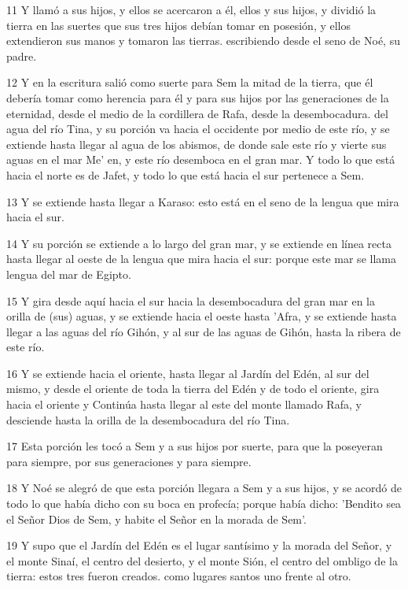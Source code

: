 \par 11 Y llamó a sus hijos, y ellos se acercaron a él, ellos y sus hijos, y dividió la tierra en las suertes que sus tres hijos debían tomar en posesión, y ellos extendieron sus manos y tomaron las tierras. escribiendo desde el seno de Noé, su padre.
\par 12 Y en la escritura salió como suerte para Sem la mitad de la tierra, que él debería tomar como herencia para él y para sus hijos por las generaciones de la eternidad, desde el medio de la cordillera de Rafa, desde la desembocadura. del agua del río Tina, y su porción va hacia el occidente por medio de este río, y se extiende hasta llegar al agua de los abismos, de donde sale este río y vierte sus aguas en el mar Me' en, y este río desemboca en el gran mar. Y todo lo que está hacia el norte es de Jafet, y todo lo que está hacia el sur pertenece a Sem.
\par 13 Y se extiende hasta llegar a Karaso: esto está en el seno de la lengua que mira hacia el sur.
\par 14 Y su porción se extiende a lo largo del gran mar, y se extiende en línea recta hasta llegar al oeste de la lengua que mira hacia el sur: porque este mar se llama lengua del mar de Egipto.
\par 15 Y gira desde aquí hacia el sur hacia la desembocadura del gran mar en la orilla de (sus) aguas, y se extiende hacia el oeste hasta 'Afra, y se extiende hasta llegar a las aguas del río Gihón, y al sur de las aguas de Gihón, hasta la ribera de este río.
\par 16 Y se extiende hacia el oriente, hasta llegar al Jardín del Edén, al sur del mismo, y desde el oriente de toda la tierra del Edén y de todo el oriente, gira hacia el oriente y Continúa hasta llegar al este del monte llamado Rafa, y desciende hasta la orilla de la desembocadura del río Tina.
\par 17 Esta porción les tocó a Sem y a sus hijos por suerte, para que la poseyeran para siempre, por sus generaciones y para siempre.
\par 18 Y Noé se alegró de que esta porción llegara a Sem y a sus hijos, y se acordó de todo lo que había dicho con su boca en profecía; porque había dicho: 'Bendito sea el Señor Dios de Sem, y habite el Señor en la morada de Sem'.
\par 19 Y supo que el Jardín del Edén es el lugar santísimo y la morada del Señor, y el monte Sinaí, el centro del desierto, y el monte Sión, el centro del ombligo de la tierra: estos tres fueron creados. como lugares santos uno frente al otro.
